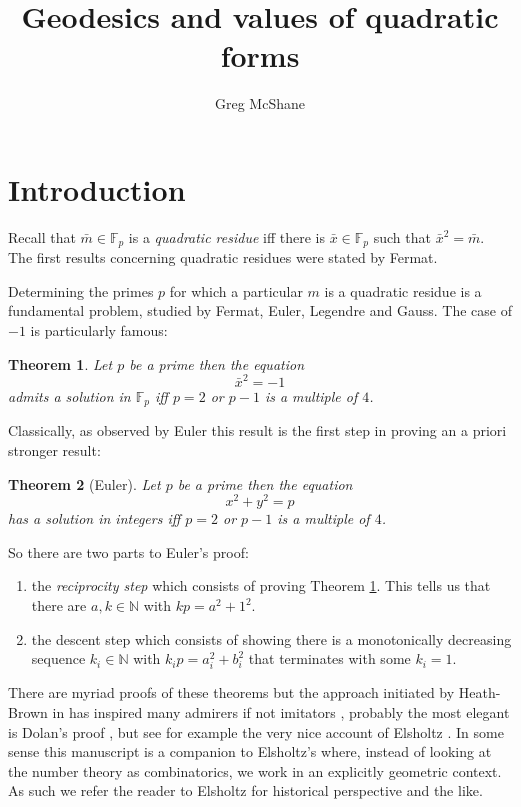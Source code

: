 \documentclass[12pt,a4paper]{amsart}
\title{Geodesics and values of quadratic forms}
\author[McShane]{Greg McShane}
\newtheorem{thm}{Theorem}[section]
\def\GG{\mathbb{G}}
\def\fp{\mathbb{F}_p}
\begin{document}
\maketitle

\section{Introduction}


Recall
that $\bar{m}\in \fp$ is a \textit{quadratic residue} iff
there is $\bar{x}\in \fp $ such that $\bar{x}^2 = \bar{m}$.
The first results concerning quadratic residues were stated by
Fermat. 

Determining the primes $p$ for which a particular $m$ is a quadratic
residue is a fundamental problem, studied by Fermat, Euler, Legendre
and Gauss. The case of $-1$ is particularly famous:

\begin{thm}\label{triv}
Let $p$ be a prime then the equation
$$\bar{x}^2 = -1$$
admits a solution in $\fp$ iff 
$p =2$ or $p-1$ is a multiple of $4$.
\end{thm}

Classically, as observed by Euler this result is the first step in proving an a priori stronger result:


\begin{thm}[Euler]\label{main}
Let $p$ be a prime then the equation
$$x^2 + y^2 = p $$
has a solution in integers  iff  $p =2$ or $p-1$ is a multiple of $4$.
\end{thm}

\noindent
So there are two parts to Euler's proof:
\begin{enumerate}
	\item the \textit{reciprocity step} which consists of
		proving Theorem \ref{triv}. This tells us
		that there are $a,k \in \mathbb{N}$ with $kp = a^2 +1^2$.
	\item the {descent step} which consists of showing
		there is a  monotonically decreasing sequence
		$k_i \in \mathbb{N}$ with $k_ip = a_i^2 +b_i^2$
		that terminates with some $k_i=1$.
\end{enumerate}

There are myriad proofs of these theorems but the approach initiated
by Heath-Brown in \cite{heath} has inspired many admirers if not 
imitators \cite{generalov, jackson,northshield, dubach} , probably the most elegant is Dolan's proof \cite{dolan},
but see for example the very nice account of Elsholtz \cite{elsholtz}.
In some sense this manuscript is a companion 
to Elsholtz's where, instead of looking at the number theory as
combinatorics, we work in an explicitly geometric context.
As such we refer the reader to Elsholtz for historical perspective
and the like. 
\end{document}

